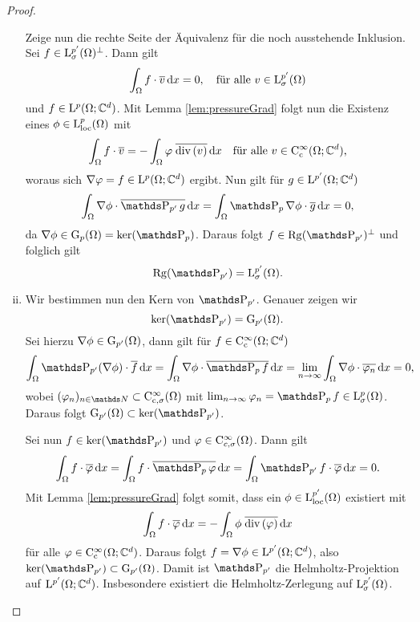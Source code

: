 \begin{proof}
\begin{enumerate}[(i)]
$$  $$
  Zeige nun die rechte Seite der Äquivalenz für die noch ausstehende Inklusion.
  Sei $f \in \mathrm{L}^{p'}_\sigma(\Omega)^\perp$.
  Dann gilt
  $$
  \int_\Omega f \cdot \overline v \, {\operatorname{d}\!{x}} = 0, \quad\text{für alle } v \in \mathrm{L}_\sigma^{p'}(\Omega)
  $$
  und $f \in \mathrm{L}^p(\Omega; \mathbb{C}^d)$.
  Mit Lemma \ref{lem:pressureGrad} folgt nun die Existenz eines $\phi \in \mathrm{L}^p_{\operatorname{loc}}(\Omega)$ mit
  $$
  \int_\Omega f \cdot \overline v = - \int_\Omega \varphi \; \overline{\mathrm{div\,} (v)} \, {\operatorname{d}\!{x}} \quad\text{für alle } v \in \mathrm{C}_{\mathrm{c}}^\infty(\Omega; \mathbb{C}^d),
  $$
  woraus sich $\nabla\varphi = f \in \mathrm{L}^p(\Omega; \mathbb{C}^d)$ ergibt.
  Nun gilt für $g \in \mathrm{L}^{p'}(\Omega; \mathbb{C}^d)$
  $$
  \int_\Omega \nabla\phi \cdot \overline{\PP_{p'} g} \d x = \int_\Omega \PP_p\nabla \phi \cdot \overline g \d x = 0,
  $$
  da $\nabla \phi \in \GG_p(\Omega) = \ker(\PP_p)$.
  Daraus folgt $f \in \Rg(\PP_{p'})^\perp$ und folglich gilt 
  $$
  \Rg(\PP_{p'}) = \Ell_\sigma^{p'}(\Omega).
  $$
\item Wir bestimmen nun den Kern von $\PP_{p'}$.
  Genauer zeigen wir
  $$
  \ker(\PP_{p'}) = \GG_{p'}(\Omega).
  $$
  Sei hierzu $\nabla \phi \in \mathrm{G}_{p'}(\Omega)$, dann gilt für $f \in \mathrm{C}_{\mathrm{c}}^\infty(\Omega; \mathbb{C}^d)$
  $$
  \int_\Omega \PP_{p'}(\nabla\phi) \cdot \overline f \d x
  = \int_\Omega \nabla \phi \cdot \overline{\PP_p f} \d x
  = \lim_{n \to \infty} \int_\Omega \nabla \phi \cdot \overline{\varphi_n} \d x
  = 0,
  $$
  wobei $(\varphi_n)_{n \in \N} \subset \CC_{\cc,\sigma}^\infty(\Omega)$ mit $\lim_{n \to \infty} \varphi_n = \PP_p f \in \Ell^p_\sigma(\Omega)$.
  Daraus folgt $\GG_{p'}(\Omega) \subset \ker(\PP_{p'})$.

  Sei nun $f \in \ker(\PP_{p'})$ und $\varphi \in \mathrm{C}^\infty_{c,\sigma}(\Omega)$.
  Dann gilt
  $$
  \int_\Omega f \cdot \overline\varphi \d x 
  = \int_\Omega f \cdot \overline{\PP_p \varphi} \d x
  = \int_\Omega \PP_{p'} f \cdot \overline{\varphi} \d x = 0.
  $$
  Mit Lemma \ref{lem:pressureGrad} folgt somit, dass ein $\phi \in \mathrm{L}_{\operatorname{loc}}^{p'}(\Omega)$ existiert mit 
  $$
  \int_\Omega f \cdot \overline\varphi \, {\operatorname{d}\!{x}}
  = -\int_\Omega \phi \; \overline{\mathrm{div\,} (\varphi)} \, {\operatorname{d}\!{x}}
  $$
  für alle $\varphi \in \mathrm{C}_{\mathrm{c}}^\infty(\Omega; \mathbb{C}^d)$.
  Daraus folgt $f = \nabla\phi \in \mathrm{L}^{p'}(\Omega; \mathbb{C}^d)$, also $\ker(\PP_{p'}) \subset \GG_{p'}(\Omega)$.
  Damit ist $\PP_{p'}$ die Helmholtz-Projektion auf $\mathrm{L}^{p'}(\Omega; \mathbb{C}^d)$.
  Insbesondere existiert die Helmholtz-Zerlegung auf $\mathrm{L}^{p'}_\sigma(\Omega)$.


\end{enumerate}
\end{proof}
